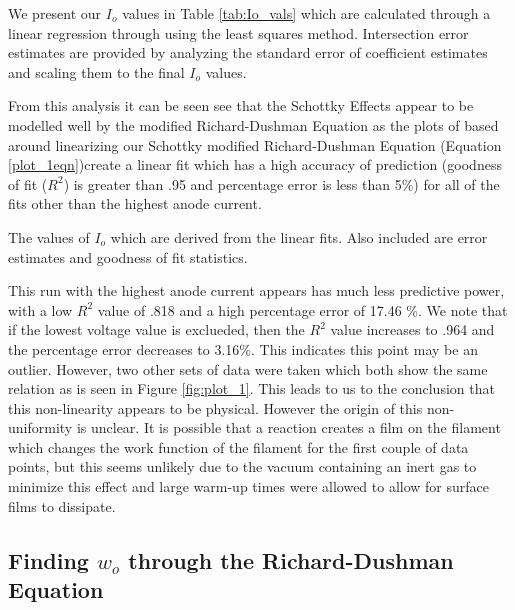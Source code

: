 We present our $I_o$ values in  Table \ref{tab:Io_vals} which are calculated through a linear regression through using the least squares method. Intersection error estimates are provided by analyzing the standard error of coefficient estimates and scaling them to the final $I_o$ values. 

From this analysis it can be seen see that the Schottky Effects appear to be modelled well by the modified Richard-Dushman Equation as the plots of based around linearizing our Schottky modified Richard-Dushman Equation (Equation \ref{plot_1eqn})create a linear fit which has a high accuracy of prediction (goodness of fit ($R^2$) is greater than .95 and percentage error is less than 5\%) for all of the fits other than the highest anode current.
\begin{table}[h]

  \footnotesize{
        
        
    }
\caption{The values of $I_o$ which are derived from the linear fits. Also included are error estimates and goodness of fit statistics.}%
\label{tab:Io_vals}
\end{table}

This run with the highest anode current appears has much less predictive power, with a low $R^2$ value of .818 and a high percentage error of 17.46 \%. We note that if the lowest voltage value is exclueded, then the $R^2$ value increases to .964 and the percentage error decreases to 3.16\%. This indicates this point may be an outlier. However, two other sets of data were taken which both show the same relation as is seen in Figure \ref{fig:plot_1}. This leads to us to the conclusion that this non-linearity appears to be physical. However the origin of this non-uniformity is unclear. It is possible that a reaction creates a film on the filament which changes the work function of the filament for the first couple of data points, but this seems unlikely due to the vacuum containing an inert gas to minimize this effect and large warm-up times were allowed to allow for surface films to dissipate.\\

\subsection{Finding $w_o$ through the Richard-Dushman Equation}

